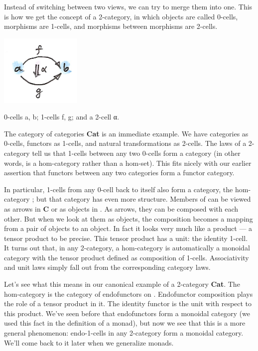 Instead of switching between two views, we can try to merge them into
one. This is how we get the concept of a 2-category, in which objects
are called 0-cells, morphisms are 1-cells, and morphisms between
morphisms are 2-cells.

\hypertarget{attachment_9117}{}
\includegraphics[width=1.53125in]{images/twocat.png}

0-cells a, b; 1-cells f, g; and a 2-cell α.

The category of categories \textbf{Cat} is an immediate example. We have
categories as 0-cells, functors as 1-cells, and natural transformations
as 2-cells. The laws of a 2-category tell us that 1-cells between any
two 0-cells form a category (in other words,  is a
hom-category rather than a hom-set). This fits nicely with our earlier
assertion that functors between any two categories form a functor
category.

In particular, 1-cells from any 0-cell back to itself also form a
category, the hom-category ; but that category has even
more structure. Members of  can be viewed as arrows in
\textbf{C} or as objects in . As arrows, they can be
composed with each other. But when we look at them as objects, the
composition becomes a mapping from a pair of objects to an object. In
fact it looks very much like a product --- a tensor product to be
precise. This tensor product has a unit: the identity 1-cell. It turns
out that, in any 2-category, a hom-category  is
automatically a monoidal category with the tensor product defined as
composition of 1-cells. Associativity and unit laws simply fall out from
the corresponding category laws.

Let's see what this means in our canonical example of a 2-category
\textbf{Cat}. The hom-category  is the category of
endofunctors on . Endofunctor composition plays the role of a
tensor product in it. The identity functor is the unit with respect to
this product. We've seen before that endofunctors form a monoidal
category (we used this fact in the definition of a monad), but now we
see that this is a more general phenomenon: endo-1-cells in any
2-category form a monoidal category. We'll come back to it later when we
generalize monads.

